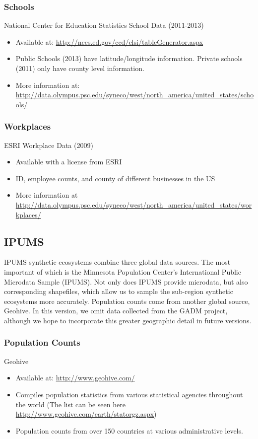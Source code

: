 \documentclass{article}
\begin{document}
		\subsubsection{Schools}
		National Center for Education Statistics School Data (2011-2013)
		\begin{itemize}
			\item Available at: \url{http://nces.ed.gov/ccd/elsi/tableGenerator.aspx}
			\item Public Schools (2013) have latitude/longitude information. Private schools (2011) only have county level information. 
			\item More information at: \url{http://data.olympus.psc.edu/syneco/west/north_america/united_states/schools/}
		\end{itemize}

		\subsubsection{Workplaces}		
		ESRI Workplace Data (2009)
		\begin{itemize}
			\item Available with a license from ESRI
			\item ID, employee counts, and county of different businesses in the US
			\item More information at \url{http://data.olympus.psc.edu/syneco/west/north_america/united_states/workplaces/}
		\end{itemize}

	\subsection{IPUMS}

		IPUMS synthetic ecosystems combine three global data sources. The most important of which is the Minnesota Population Center's International Public Microdata Sample (IPUMS). Not only does IPUMS provide microdata, but also corresponding shapefiles, which allow us to sample the sub-region synthetic ecosystems more accurately. Population counts come from another global source, Geohive. In this version, we omit data collected from the GADM project, although we hope to incorporate this greater geographic detail in future versions. 

		\subsubsection{Population Counts}
		Geohive 
		\begin{itemize}
			\item Available at: \url{http://www.geohive.com/}
			\item Compiles population statistics from various statistical agencies throughout the world (The list can be seen here \url{http://www.geohive.com/earth/statorgz.aspx})
			\item Population counts from over 150 countries at various administrative levels. 
		\end{itemize}
\end{document}
